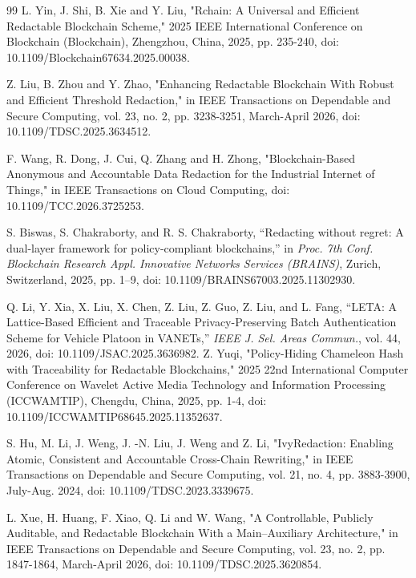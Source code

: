 \documentclass[lettersize,journal]{IEEEtran}
\begin{document}
\begin{thebibliography}{99}
    L. Yin, J. Shi, B. Xie and Y. Liu, "Rchain: A Universal and Efficient Redactable Blockchain Scheme," 2025 IEEE International Conference on Blockchain (Blockchain), Zhengzhou, China, 2025, pp. 235-240, doi: 10.1109/Blockchain67634.2025.00038.
    
    Z. Liu, B. Zhou and Y. Zhao, "Enhancing Redactable Blockchain With Robust and Efficient Threshold Redaction," in IEEE Transactions on Dependable and Secure Computing, vol. 23, no. 2, pp. 3238-3251, March-April 2026, doi: 10.1109/TDSC.2025.3634512.
    
    F. Wang, R. Dong, J. Cui, Q. Zhang and H. Zhong, "Blockchain-Based Anonymous and Accountable Data Redaction for the Industrial Internet of Things," in IEEE Transactions on Cloud Computing, doi: 10.1109/TCC.2026.3725253.
    
    S. Biswas, S. Chakraborty, and R. S. Chakraborty,
    ``Redacting without regret: A dual-layer framework for
    policy-compliant blockchains,''
    in \textit{Proc. 7th Conf. Blockchain Research Appl. Innovative
    Networks Services (BRAINS)}, Zurich, Switzerland, 2025,
    pp. 1--9, doi: 10.1109/BRAINS67003.2025.11302930.
    
    Q. Li, Y. Xia, X. Liu, X. Chen, Z. Liu, Z. Guo, Z. Liu, and L. Fang, ``LETA: A Lattice-Based Efficient and Traceable Privacy-Preserving Batch Authentication Scheme for Vehicle Platoon in VANETs,'' \textit{IEEE J. Sel. Areas Commun.}, vol. 44, 2026, doi: 10.1109/JSAC.2025.3636982.    
    Z. Yuqi, "Policy-Hiding Chameleon Hash with Traceability for Redactable Blockchains," 2025 22nd International Computer Conference on Wavelet Active Media Technology and Information Processing (ICCWAMTIP), Chengdu, China, 2025, pp. 1-4, doi: 10.1109/ICCWAMTIP68645.2025.11352637.
    
    S. Hu, M. Li, J. Weng, J. -N. Liu, J. Weng and Z. Li, "IvyRedaction: Enabling Atomic, Consistent and Accountable Cross-Chain Rewriting," in IEEE Transactions on Dependable and Secure Computing, vol. 21, no. 4, pp. 3883-3900, July-Aug. 2024, doi: 10.1109/TDSC.2023.3339675.
    
    L. Xue, H. Huang, F. Xiao, Q. Li and W. Wang, "A Controllable, Publicly Auditable, and Redactable Blockchain With a Main–Auxiliary Architecture," in IEEE Transactions on Dependable and Secure Computing, vol. 23, no. 2, pp. 1847-1864, March-April 2026, doi: 10.1109/TDSC.2025.3620854.
    

\end{thebibliography}
\end{document}
